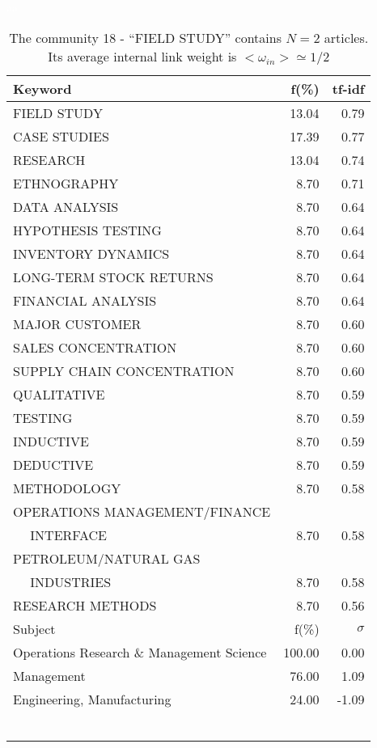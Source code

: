 \documentclass[a4paper,11pt]{report}
\begin{document}
\begin{landscape}
\begin{table}[!ht]
\caption{The community 18 - ``FIELD STUDY'' contains $N = 2$ articles. Its average internal link weight is $<\omega_{in}> \simeq 1/2$ }
\textcolor{white}{aa}\\
{\scriptsize\begin{tabular}{|l r  r|}
\hline
Keyword & f(\%) & tf-idf \\
\hline
FIELD STUDY & 13.04 & 0.79\\
CASE STUDIES & 17.39 & 0.77\\
RESEARCH & 13.04 & 0.74\\
ETHNOGRAPHY & 8.70 & 0.71\\
DATA ANALYSIS & 8.70 & 0.64\\
HYPOTHESIS TESTING & 8.70 & 0.64\\
INVENTORY DYNAMICS & 8.70 & 0.64\\
LONG-TERM STOCK RETURNS & 8.70 & 0.64\\
FINANCIAL ANALYSIS & 8.70 & 0.64\\
MAJOR CUSTOMER & 8.70 & 0.60\\
SALES CONCENTRATION & 8.70 & 0.60\\
SUPPLY CHAIN CONCENTRATION & 8.70 & 0.60\\
QUALITATIVE & 8.70 & 0.59\\
TESTING & 8.70 & 0.59\\
INDUCTIVE & 8.70 & 0.59\\
DEDUCTIVE & 8.70 & 0.59\\
METHODOLOGY & 8.70 & 0.58\\
OPERATIONS MANAGEMENT/FINANCE &  &\\
$\quad$ INTERFACE & 8.70 & 0.58\\
PETROLEUM/NATURAL GAS &  &\\
$\quad$ INDUSTRIES & 8.70 & 0.58\\
RESEARCH METHODS & 8.70 & 0.56\\
\hline
\hline
Subject & f(\%) & $\sigma$\\
\hline
Operations Research \& Management Science & 100.00 & 0.00\\
Management & 76.00 & 1.09\\
Engineering, Manufacturing & 24.00 & -1.09\\
 &  & \\
 &  & \\
 &  & \\
 &  & \\
 &  & \\
 &  & \\

\end{tabular}}
\end{table}
\end{landscape}
\end{document}
